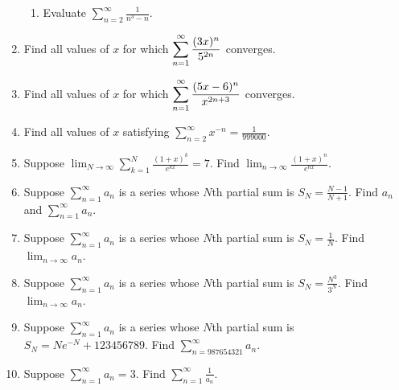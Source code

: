 \documentclass[11pt]{article}
\begin{document}
\begin{enumerate}
\begin{enumerate}
    \item Evaluate $\displaystyle \sum_{n=2}^\infty \frac1{n^3-n}$.

  \end{enumerate}

  \item Find all values of $x$ for which $\displaystyle 
    \sum_{n=1}^\infty {(3x)^n \over 5^{2n}}
  $ converges.

  \item Find all values of $x$ for which $\displaystyle 
    \sum_{n=1}^\infty {(5x - 6)^n \over x^{2n + 3}}
  $ converges.

  \item Find all values of $x$ satisfying $\displaystyle \sum_{n=2}^\infty
  x^{-n} = \frac1{999000}$.

  \item Suppose
  $\displaystyle\lim_{N\to\infty}\sum_{k=1}^N\frac{(1+x)^k}{e^{kx}}=7$. Find
  $\displaystyle\lim_{n\to\infty}\frac{(1+x)^n}{e^{nx}}$.

  \item Suppose $\displaystyle\sum_{n=1}^\infty a_n$ is a series whose $N$th
  partial sum is $\displaystyle S_N=\frac{N-1}{N+1}$. Find
  $a_n$ and $\displaystyle\sum_{n=1}^\infty a_n$.

  \item Suppose $\displaystyle\sum_{n=1}^\infty a_n$ is a series whose $N$th
  partial sum is $\displaystyle S_N=\frac1N$. Find
  $\displaystyle\lim_{n\to\infty}a_n$.

  \item Suppose $\displaystyle\sum_{n=1}^\infty a_n$ is a series whose $N$th
  partial sum is $\displaystyle S_N=\frac{N^3}{3^N}$. Find
  $\displaystyle\lim_{n\to\infty}a_n$.

  \item Suppose $\displaystyle\sum_{n=1}^\infty a_n$ is a series whose $N$th
  partial sum is $\displaystyle S_N=Ne^{-N}+123456789$. Find
  $\displaystyle\sum_{n=987654321}^\infty a_n$.

  \item Suppose $\displaystyle\sum_{n=1}^\infty a_n=3$. Find
  $\displaystyle\sum_{n=1}^\infty\frac1{a_n}$.

\end{enumerate}
\end{document}
